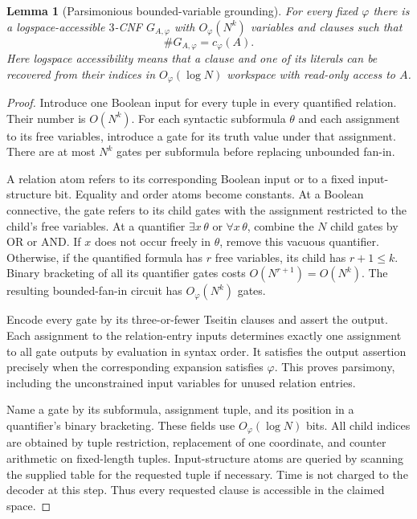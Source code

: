 \documentclass[11pt]{article}
\newtheorem{lemma}[theorem]{Lemma}
\theoremstyle{definition}
\theoremstyle{remark}
\begin{document}
\begin{lemma}[Parsimonious bounded-variable grounding]
\label{lem:fo-grounding}
For every fixed $\varphi$ there is a logspace-accessible $3$-CNF
$G_{A,\varphi}$ with $O_\varphi(N^k)$ variables and clauses such that
\[
 \#G_{A,\varphi}=c_\varphi(A).
\]
Here logspace accessibility means that a clause and one of its literals
can be recovered from their indices in $O_\varphi(\log N)$ workspace
with read-only access to $A$.
\end{lemma}
\begin{proof}
Introduce one Boolean input for every tuple in every quantified relation.
Their number is $O(N^k)$. For each syntactic subformula $\theta$ and
each assignment to its free variables, introduce a gate for its truth
value under that assignment. There are at most $N^k$ gates per
subformula before replacing unbounded fan-in.

A relation atom refers to its corresponding Boolean input or to a
fixed input-structure bit. Equality and order atoms become constants.
At a Boolean connective, the gate refers to its child gates with the
assignment restricted to the child's free variables. At a quantifier
$\exists x\,\theta$ or $\forall x\,\theta$, combine the $N$ child
gates by OR or AND. If $x$ does not occur freely in $\theta$, remove
this vacuous quantifier. Otherwise, if the quantified formula has $r$
free variables, its child has $r+1\leq k$. Binary bracketing of all its
quantifier gates costs $O(N^{r+1})=O(N^k)$. The resulting bounded-fan-in
circuit has $O_\varphi(N^k)$ gates.

Encode every gate by its three-or-fewer Tseitin clauses and assert the
output. Each assignment to the relation-entry inputs determines exactly
one assignment to all gate outputs by evaluation in syntax order. It
satisfies the output assertion precisely when the corresponding
expansion satisfies $\varphi$. This proves parsimony, including the
unconstrained input variables for unused relation entries.

Name a gate by its subformula, assignment tuple, and its position in a
quantifier's binary bracketing. These fields use $O_\varphi(\log N)$
bits. All child indices are obtained by tuple restriction, replacement
of one coordinate, and counter arithmetic on fixed-length tuples.
Input-structure atoms are queried by scanning the supplied table for
the requested tuple if necessary. Time is not charged to the decoder
at this step. Thus every requested clause is accessible in the claimed
space.
\end{proof}
\end{document}
